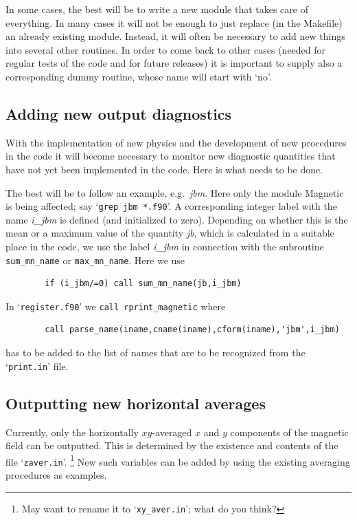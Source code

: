 \documentclass[12pt,twoside,notitlepage,a4paper]{article}
\makeatletter
\newcommand{\code}[1]{\texttt{#1}}
\newcommand{\var}[1]{\textsl{#1}\index{#1@\emph{#1}}\/}
\newcommand{\file}[1]{`\texttt{#1}'}
\makeatother
\begin{document}
In some cases, the best will be
to write a new module that takes care of everything.
In many cases it will not be enough to just replace (in the Makefile)
an already existing module. Instead, it will often be necessary to
add new things into several other routines. In order to come back
to other cases (needed for regular tests of the code and for future
releases) it is important to supply also a corresponding dummy routine,
whose name will start with `no'.


\subsection{Adding new output diagnostics}

With the implementation of new physics and the development of new procedures
in the code it will become necessary to monitor new diagnostic quantities that
have not yet been implemented in the code. Here is what needs to be done.

The best will be to follow an example, e.g.\ \var{jbm}. Here only the
module Magnetic is being affected; say \file{grep jbm *.f90}. A corresponding
integer label with the name \var{i\_jbm} is defined (and initialized to zero).
Depending on whether this is the mean or a maximum value of the quantity
\var{jb}, which is calculated in a suitable place in the code, we use the
label \var{i\_jbm} in connection with the subroutine \code{sum\_mn\_name} or
\code{max\_mn\_name}. Here we use
\begin{verbatim}
        if (i_jbm/=0) call sum_mn_name(jb,i_jbm)
\end{verbatim}
In \file{register.f90} we \code{call rprint\_magnetic} where 
\begin{verbatim}
        call parse_name(iname,cname(iname),cform(iname),'jbm',i_jbm)
\end{verbatim}
has to be added to the list of names that are to be recognized from the
\file{print.in} file.


\subsection{Outputting new horizontal averages}

Currently, only the horizontally $xy$-averaged $x$ and $y$ components
of the magnetic field can be outputted. This is determined by the existence
and contents of the file \file{zaver.in}.
\footnote{May want to rename it to \file{xy\_aver.in}; what do you think?}
New such variables can be added by using the existing averaging
procedures as examples.
\end{document}
